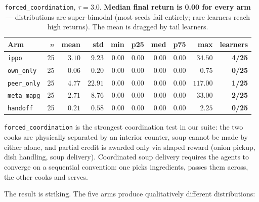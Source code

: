 \documentclass[11pt,a4paper]{article}
\newcommand{\arm}[1]{\texttt{#1}}
\newcommand{\thr}{\tau}
\begin{document}
\begin{table}[h]
\centering
\caption{\texttt{forced\_coordination}, $\thr = 3.0$. \textbf{Median final return is 0.00 for every arm} --- distributions are super-bimodal (most seeds fail entirely; rare learners reach high returns). The mean is dragged by tail learners.}
\label{tab:forced}
\small
\begin{tabular}{lrrrrrrrrr}
\toprule
\textbf{Arm} & $n$ & \textbf{mean} & \textbf{std} & \textbf{min} & \textbf{p25} & \textbf{med} & \textbf{p75} & \textbf{max} & \textbf{learners} \\
\midrule
\arm{ippo}      & 25 & $3.10$ & $9.23$ & $0.00$ & $0.00$ & $0.00$ & $0.00$ & $34.50$ & \textbf{4/25} \\
\arm{own\_only} & 25 & $0.06$ & $0.20$ & $0.00$ & $0.00$ & $0.00$ & $0.00$ & $\phantom{0}0.75$ & \textbf{0/25} \\
\arm{peer\_only}& 25 & $\mathbf{4.77}$ & $\mathbf{22.91}$ & $0.00$ & $0.00$ & $0.00$ & $0.00$ & $\mathbf{117.00}$ & \textbf{1/25} \\
\arm{meta\_mapg}& 25 & $2.71$ & $8.76$ & $0.00$ & $0.00$ & $0.00$ & $0.00$ & $33.00$ & \textbf{2/25} \\
\arm{handoff}   & 25 & $0.21$ & $0.58$ & $0.00$ & $0.00$ & $0.00$ & $0.00$ & $\phantom{0}2.25$ & \textbf{0/25} \\
\bottomrule
\end{tabular}
\end{table}

\texttt{forced\_coordination} is the strongest coordination test in our suite:
the two cooks are physically separated by an interior counter, soup cannot be made by either alone, and partial credit is awarded only via shaped reward (onion pickup, dish handling, soup delivery).
Coordinated soup delivery requires the agents to converge on a sequential convention: one picks ingredients, passes them across, the other cooks and serves.

The result is striking. The five arms produce qualitatively different distributions:
\end{document}
